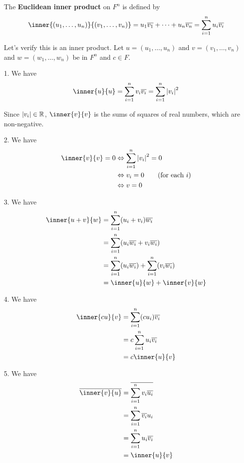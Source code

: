 \documentclass{article}
\begin{document}
\begin{example}
  The \textbf{Euclidean inner product} on $F^n$ is defined by \[
    \inner{(u_1, \ldots, u_n)}{(v_1, \ldots, v_n)} = u_1\overline{v_1} + \dots + u_n\overline{v_n} = \sum_{i=1}^n u_i\overline{v_i}
  \]

  Let's verify this is an inner product. Let $u = (u_1, \ldots, u_n)$ and $v = (v_1, \ldots, v_n)$ and $w = (w_1, \ldots, w_n)$ be in $F^n$ and $c \in F$.

  1. We have \[
    \inner{u}{u} = \sum_{i=1}^n v_i\overline{v_i} = \sum_{i=1}^n \abs{v_i}^2
  \]

  Since $\abs{v_i} \in \mathbb{R}$, $\inner{v}{v}$ is the sums of squares of real numbers, which are non-negative.

  2. We have
  \begin{align*}
    \inner{v}{v} = 0 & \iff \sum_{i=1}^n \abs{v_i}^2 = 0 \\
                     & \iff v_i = 0 \tag{for each $i$}   \\
                     & \iff v = 0
  \end{align*}

  3. We have
  \begin{align*}
    \inner{u+v}{w} & = \sum_{i=1}^n (u_i + v_i)\overline{w_i}                              \\
                   & = \sum_{i=1}^n (u_i\overline{w_i} + v_i\overline{w_i})                \\
                   & = \sum_{i=1}^n (u_i\overline{w_i}) + \sum_{i=1}^n (v_i\overline{w_i}) \\
                   & = \inner{u}{w} + \inner{v}{w}                                         \\
  \end{align*}

  4. We have
  \begin{align*}
    \inner{cu}{v} & = \sum_{i=1}^n (cu_i)\overline{v_i} \\
                  & = c\sum_{i=1}^n u_i\overline{v_i}   \\
                  & = c\inner{u}{v}
  \end{align*}

  5. We have
  \begin{align*}
    \overline{\inner{v}{u}} & = \overline{\sum_{i=1}^n v_i\overline{u_i}} \\
                            & = \sum_{i=1}^n \overline{v_i}u_i            \\
                            & = \sum_{i=1}^n u_i\overline{v_i}            \\
                            & = \inner{u}{v}
  \end{align*}
\end{example}
\end{document}

